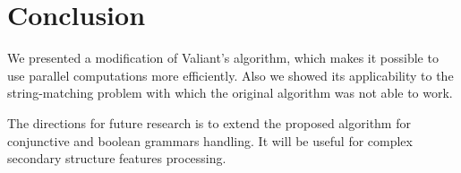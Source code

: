 \section{Conclusion}

We presented a modification of Valiant's algorithm, which makes it possible to use parallel computations more efficiently. 
Also we showed its applicability to the string-matching problem with which the original algorithm was not able to work.

The directions for future research is to extend the proposed algorithm for conjunctive and boolean grammars handling.
It will be useful for complex secondary structure features processing.